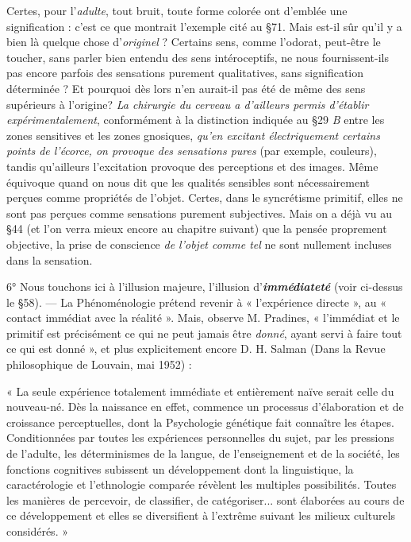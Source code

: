 \vspace{0.24cm}
{\footnotesize 
Certes, pour l'{\it adulte}, tout bruit, toute forme colorée ont d'emblée une
signification : c’est ce que montrait l’exemple cité au \S 71. Mais est-il sûr
qu’il y a bien là quelque chose d'{\it originel} ? Certains sens, comme l’odorat,
peut-être le toucher, sans parler bien entendu des sens intéroceptifs, ne
nous fournissent-ils pas encore parfois des sensations purement qualitatives,
sans signification déterminée ? Et pourquoi dès lors n’en aurait-il pas été
de même des sens supérieurs à l’origine? {\it La chirurgie du cerveau a d’ailleurs
permis d'établir expérimentalement}, conformément à la distinction indiquée
au \S 29 {\it B} entre les zones sensitives et les zones gnosiques, {\it qu’en excitant
électriquement certains points de l'écorce, on provoque des sensations pures}
(par exemple, couleurs), tandis qu’ailleurs l’excitation provoque des
perceptions et des images. Même équivoque quand on nous dit que les qualités
sensibles sont nécessairement perçues comme propriétés de l’objet. Certes,
dans le syncrétisme primitif, elles ne sont pas perçues comme sensations
purement subjectives. Mais on a déjà vu au \S 44 (et l’on verra mieux encore
au chapitre suivant) que la pensée proprement objective, la prise de conscience
{\it de l’objet comme tel} ne sont nullement incluses dans la sensation.}
\vspace{0.31cm}

6° Nous touchons ici à l'illusion majeure, l'illusion d’\textbf{\textit {immédiateté}}
(voir ci-dessus le \S 58). — La Phénoménologie prétend revenir à
« l’expérience directe », au « contact immédiat avec la réalité ». Mais,
observe M. Pradines, « l'immédiat et le primitif est précisément
ce qui ne peut jamais être {\it donné}, ayant servi à faire tout ce qui est
donné », et plus explicitement encore D. H. Salman
{\scriptsize (Dans la Revue philosophique de Louvain, mai 1952)} :

\vspace{0.24cm}
{\footnotesize 
« La seule expérience totalement immédiate et entièrement naïve serait
celle du nouveau-né. Dès la naissance en effet, commence un processus d’élaboration
et de croissance perceptuelles, dont la Psychologie génétique fait
connaître les étapes. Conditionnées par toutes les expériences personnelles
du sujet, par les pressions de l’adulte, les déterminismes de la langue, de
l’enseignement et de la société, les fonctions cognitives subissent un développement
dont la linguistique, la caractérologie et l’ethnologie comparée
révèlent les multiples possibilités. Toutes les manières de percevoir, de
classifier, de catégoriser... sont élaborées au cours de ce développement et
elles se diversifient à l'extrême suivant les milieux culturels considérés. »}
\vspace{0.31cm}

